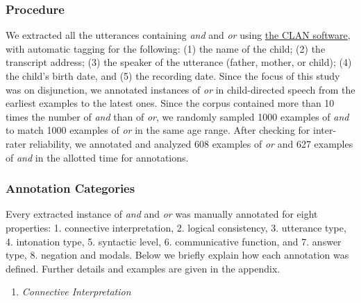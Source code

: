 \documentclass[
  english,
  ,man,floatsintext]{apa6}
\providecommand{\tightlist}{%
  \setlength{\itemsep}{0pt}\setlength{\parskip}{0pt}}
\begin{document}
\hypertarget{procedure-1}{%
\subsubsection{Procedure}\label{procedure-1}}

We extracted all the utterances containing \emph{and} and \emph{or} using \href{http://alpha.talkbank.org/clan/}{the CLAN software}, with automatic tagging for the following: (1) the name of the child; (2) the transcript address; (3) the speaker of the utterance (father, mother, or child); (4) the child's birth date, and (5) the recording date. Since the focus of this study was on disjunction, we annotated instances of \emph{or} in child-directed speech from the earliest examples to the latest ones. Since the corpus contained more than 10 times the number of \emph{and} than of \emph{or}, we randomly sampled 1000 examples of \emph{and} to match 1000 examples of \emph{or} in the same age range. After checking for inter-rater reliability, we annotated and analyzed 608 examples of \emph{or} and 627 examples of \emph{and} in the allotted time for annotations.

\hypertarget{annotation-categories}{%
\subsubsection{Annotation Categories}\label{annotation-categories}}

Every extracted instance of \emph{and} and \emph{or} was manually annotated for eight properties: 1. connective interpretation, 2. logical consistency, 3. utterance type, 4. intonation type, 5. syntactic level, 6. communicative function, and 7. answer type, 8. negation and modals. Below we briefly explain how each annotation was defined. Further details and examples are given in the appendix.

\begin{enumerate}
\def\labelenumi{\arabic{enumi}.}
\tightlist
\item
  \emph{Connective Interpretation}
\end{enumerate}
\end{document}
